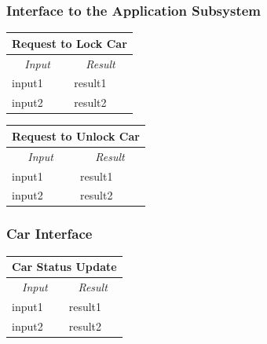 \documentclass[english]{article}
\begin{document}
\subsubsection{Interface to the Application Subsystem}
\begin{center}

	\begin{tabular}{ | p{6cm} | p{6cm} | }
		\hline 


		\hline

		\multicolumn{2}{|c|}{\textbf{Request to Lock Car}} \\
		\hline
		\multicolumn{1}{|c|}{\textit{Input}} & \multicolumn{1}{c|}{\textit{Result}} \\
		\hline
		input1 & result1 \\
		\hline
		input2 & result2 \\
		\hline
	\end{tabular}
\end{center}

\begin{center}

	\begin{tabular}{ | p{6cm} | p{6cm} | }
		\hline 


		\hline

		\multicolumn{2}{|c|}{\textbf{Request to Unlock Car}} \\
		\hline
		\multicolumn{1}{|c|}{\textit{Input}} & \multicolumn{1}{c|}{\textit{Result}} \\
		\hline
		input1 & result1 \\
		\hline
		input2 & result2 \\
		\hline
	\end{tabular}
\end{center}

\subsubsection{Car Interface}
\begin{center}

	\begin{tabular}{ | p{6cm} | p{6cm} | }
		\hline 


		\hline

		\multicolumn{2}{|c|}{\textbf{Car Status Update}} \\
		\hline
		\multicolumn{1}{|c|}{\textit{Input}} & \multicolumn{1}{c|}{\textit{Result}} \\
		\hline
		input1 & result1 \\
		\hline
		input2 & result2 \\
		\hline
	\end{tabular}
\end{center}
\end{document}
